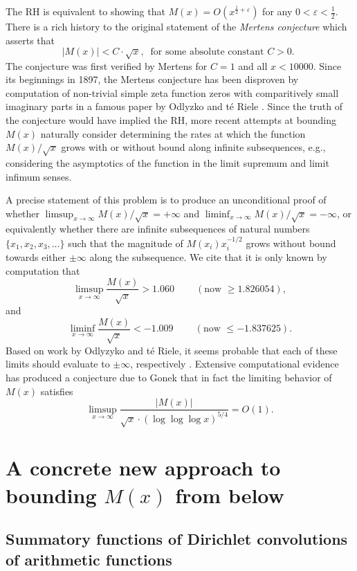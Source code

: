 \documentclass[11pt,reqno,a4letter]{article}
\numberwithin{figure}{section}
\numberwithin{table}{section}
\newcommand{\cf}{\textit{cf.\ }}
\newcommand{\seqnum}[1]{\href{http://oeis.org/#1}{\color{ProcessBlue}{\underline{#1}}}}
\theoremstyle{plain}
\numberwithin{theorem}{section}
\theoremstyle{definition}
\begin{document}
The RH is equivalent to showing that 
$M(x) = O\left(x^{\frac{1}{2}+\varepsilon}\right)$ for any 
$0 < \varepsilon < \frac{1}{2}$. 
There is a rich history to the original statement of the \emph{Mertens conjecture} which 
asserts that 
\[ 
|M(x)| < C \cdot \sqrt{x},\ \text{ for some absolute constant $C > 0$. }
\] 
The conjecture was first verified by Mertens for $C = 1$ and all $x < 10000$. 
Since its beginnings in 1897, the Mertens conjecture has been disproven by computation 
of non-trivial simple zeta function zeros with comparitively small imaginary parts in a famous paper by 
Odlyzko and t\'{e} Riele \cite{ODLYZ-TRIELE}. 
Since the truth of the conjecture would have implied the RH, more recent attempts 
at bounding $M(x)$ naturally consider determining the rates at which the function 
$M(x) / \sqrt{x}$ grows with or without bound along infinite 
subsequences, e.g., considering the asymptotics of the function in the limit supremum and 
limit infimum senses. 

A precise statement of this 
problem is to produce an unconditional proof of whether 
$\limsup_{x \rightarrow \infty} M(x) / \sqrt{x} = +\infty$ and 
$\liminf_{x \rightarrow \infty} M(x) / \sqrt{x} = -\infty$, or 
equivalently whether there are infinite subsequences of natural numbers 
$\{x_1, x_2, x_3, \ldots\}$ such that the magnitude of 
$M(x_i) x_i^{-1/2}$ grows without bound towards either $\pm \infty$ 
along the subsequence. 
We cite that it is only known by computation 
that \cite[\cf \S 4.1]{PRIMEREC} 
\cite[\cf \seqnum{A051400}; \seqnum{A051401}]{OEIS} 
\[
\limsup_{x\rightarrow\infty} \frac{M(x)}{\sqrt{x}} > 1.060\ \qquad (\text{now } \geq 1.826054), 
\] 
and 
\[ 
\liminf_{x\rightarrow\infty} \frac{M(x)}{\sqrt{x}} < -1.009\ \qquad (\text{now } \leq -1.837625). 
\] 
Based on work by Odlyzyko and t\'{e} Riele, it seems probable that 
each of these limits should evaluate to $\pm \infty$, respectively 
\cite{ODLYZ-TRIELE,MREVISITED,ORDER-MERTENSFN,HURST-2017}. 
Extensive computational evidence has produced 
a conjecture due to Gonek that in fact the limiting behavior of 
$M(x)$ satisfies \cite{NG-MERTENS}
$$\limsup_{x \rightarrow \infty} \frac{|M(x)|}{\sqrt{x} \cdot (\log\log\log x)^{5/4}} = O(1).$$ 

\newpage 
\section{A concrete new approach to bounding $M(x)$ from below} 

\subsection{Summatory functions of Dirichlet convolutions of arithmetic functions} 
\end{document}
